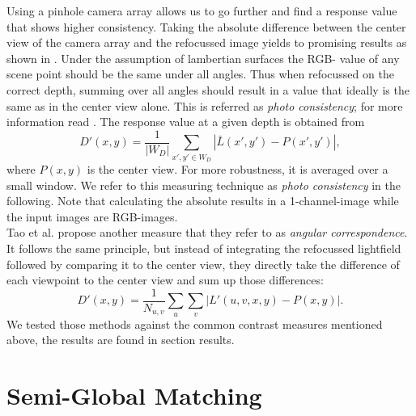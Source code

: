 \documentclass  [
  paper    = a4,
  BCOR     = 10mm,
  twoside,
  fontsize = 12pt,
  fleqn,
  toc      = bibnumbered,
  toc      = listofnumbered,
  numbers  = noendperiod,
  headings = normal,
  listof   = leveldown,
  version  = 3.03
]                                       {scrreprt}
\begin{document}
Using a pinhole camera array allows us to go further and find a response value that shows higher consistency. Taking the absolute difference between the center view of the camera array and the refocussed image yields to promising results as shown in \cite{tao2017shape}. Under the assumption of lambertian surfaces the RGB- value of any scene point should be the same under all angles. Thus when refocussed on the correct depth, summing over all angles should result in a value that ideally is the same as in the center view alone. This is referred as \textit{photo consistency}; for more information read \cite{tao2017shape}.
The response value at a given depth is obtained from
\begin{equation}\label{key}
D'(x,y) = \frac{1}{|W_D|}\sum_{x',y' \in W_D} \left|\bar{L}(x',y')- P(x', y')\right|,
\end{equation}
where $P(x,  y)$ is the center view. For more robustness, it is averaged over a small window. We refer to this measuring technique as \textit{photo consistency} in the following. Note that calculating the absolute results in a 1-channel-image while the input images are RGB-images. \\ Tao et al. propose another measure that they refer to as \textit{angular correspondence}. It follows the same principle, but instead of integrating the refocussed lightfield followed by comparing it to the center view, they directly take the difference of each viewpoint to the center view and sum up those differences:
\begin{equation}\label{eq:responsecorr}
D'(x,y) = \frac{1}{N_{u,v}}\sum_{u}\sum_{v}  \left|L'(u, v, x, y) - P(x,y)\right|.
\end{equation}
We tested those methods against the common contrast measures mentioned above, the results are found in section results.

\section{Semi-Global Matching}
\end{document}
